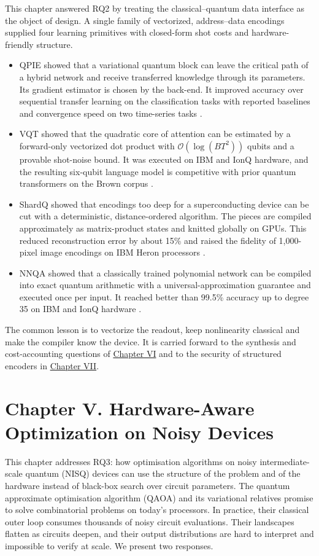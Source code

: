 \documentclass{report}
\theoremstyle{plain}
\theoremstyle{definition}
\theoremstyle{remark}
\newcommand{\bigO}[1]{\mathcal{O}\!\left(#1\right)}
\begin{document}
This chapter answered RQ2 by treating the classical--quantum data interface as the object of design. A single family of vectorized, address--data encodings supplied four learning primitives with closed-form shot costs and hardware-friendly structure.
\begin{itemize}
\item QPIE showed that a variational quantum block can leave the critical path of a hybrid network and receive transferred knowledge through its parameters. Its gradient estimator is chosen by the back-end. It improved accuracy over sequential transfer learning on the classification tasks with reported baselines and convergence speed on two time-series tasks \cite{guo2025qpie}.
\item VQT showed that the quadratic core of attention can be estimated by a forward-only vectorized dot product with $\bigO{\log(BT^2)}$ qubits and a provable shot-noise bound. It was executed on IBM and IonQ hardware, and the resulting six-qubit language model is competitive with prior quantum transformers on the Brown corpus \cite{guo2025vqt}.
\item ShardQ showed that encodings too deep for a superconducting device can be cut with a deterministic, distance-ordered algorithm. The pieces are compiled approximately as matrix-product states and knitted globally on GPUs. This reduced reconstruction error by about 15\% and raised the fidelity of 1,000-pixel image encodings on IBM Heron processors \cite{guo2025shardq}.
\item NNQA showed that a classically trained polynomial network can be compiled into exact quantum arithmetic with a universal-approximation guarantee and executed once per input. It reached better than 99.5\% accuracy up to degree 35 on IBM and IonQ hardware \cite{guo2026nnqa}.
\end{itemize}
The common lesson is to vectorize the readout, keep nonlinearity classical and make the compiler know the device. It is carried forward to the synthesis and cost-accounting questions of \hyperref[ch:synthesis]{Chapter VI} and to the security of structured encoders in \hyperref[ch:qec]{Chapter VII}.


\chapter{Chapter V. Hardware-Aware Optimization on Noisy Devices}\label{ch:nisq}

This chapter addresses RQ3: how optimisation algorithms on noisy intermediate-scale quantum (NISQ) devices can use the structure of the problem and of the hardware instead of black-box search over circuit parameters. The quantum approximate optimisation algorithm (QAOA) and its variational relatives promise to solve combinatorial problems on today's processors. In practice, their classical outer loop consumes thousands of noisy circuit evaluations. Their landscapes flatten as circuits deepen, and their output distributions are hard to interpret and impossible to verify at scale. We present two responses.
\end{document}
